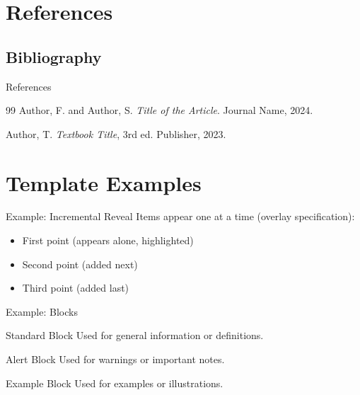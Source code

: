 \documentclass[aspectratio=169]{beamer}
\begin{document}
\section{References}

\subsection{Bibliography}

\begin{autoframe}{References}
    \begin{thebibliography}{99}
         Author, F. and Author, S.
        \emph{Title of the Article}.
        Journal Name, 2024.

         Author, T.
        \emph{Textbook Title}, 3rd ed.
        Publisher, 2023.
    \end{thebibliography}
\end{autoframe}





\appendix
\section*{Template Examples}

\begin{frame}{Example: Incremental Reveal}
    Items appear one at a time (overlay specification):
    \begin{itemize}[<+-| alert@+>]
        \item First point (appears alone, highlighted)
        \item Second point (added next)
        \item Third point (added last)
    \end{itemize}
\end{frame}

\begin{frame}{Example: Blocks}
    \begin{block}{Standard Block}
        Used for general information or definitions.
    \end{block}

    \begin{alertblock}{Alert Block}
        Used for warnings or important notes.
    \end{alertblock}

    \begin{exampleblock}{Example Block}
        Used for examples or illustrations.
    \end{exampleblock}
\end{frame}
\end{document}
